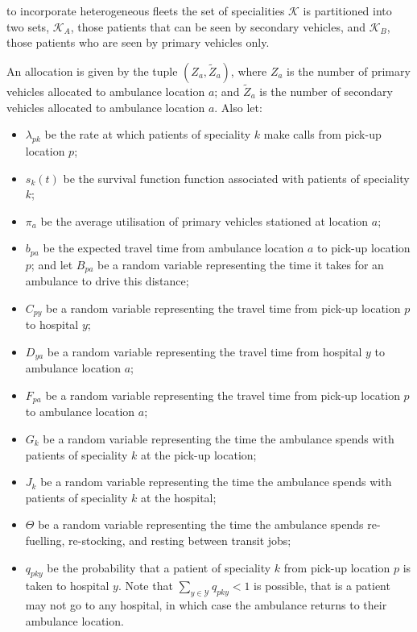 \documentclass[numbers,webpdf,imaman]{ima-authoring-template}%
\begin{document}
\noindent
to incorporate heterogeneous fleets the set of specialities $\mathcal{K}$ is
partitioned into two sets, $\mathcal{K}_A$, those patients that can be seen by
secondary vehicles, and $\mathcal{K}_B$, those patients who are seen by
primary vehicles only.

An allocation is given by the tuple $\left(Z_a, \tilde{Z}_a\right)$, where $Z_a$
is the number of primary vehicles allocated to ambulance location $a$; and
$\tilde{Z}_a$ is the number of secondary vehicles allocated to ambulance
location $a$. Also let:

\begin{itemize}
  \item $\lambda_{pk}$ be the rate at which patients of speciality $k$ make
        calls from pick-up location $p$;
  \item $s_k(t)$ be the survival function function associated with patients of
        speciality $k$;
  \item $\pi_a$ be the average utilisation of primary vehicles stationed at
        location $a$;
  \item $b_{pa}$ be the expected travel time from ambulance location $a$ to
        pick-up location $p$; and let $B_{pa}$ be a random variable representing
        the time it takes for an ambulance to drive this distance;
  \item $C_{py}$ be a random variable representing the travel time from pick-up
        location $p$ to hospital $y$;
  \item $D_{ya}$ be a random variable representing the travel time from hospital
        $y$ to ambulance location $a$;
  \item $F_{pa}$ be a random variable representing the travel time from pick-up
        location $p$ to ambulance location $a$;
  \item $G_k$ be a random variable representing the time the ambulance spends
        with patients of speciality $k$ at the pick-up location;
  \item $J_k$ be a random variable representing the time the ambulance spends
        with patients of speciality $k$ at the hospital;
  \item $\Theta$ be a random variable representing the time the ambulance spends
        re-fuelling, re-stocking, and resting between transit jobs;
  \item $q_{pky}$ be the probability that a patient of speciality $k$ from
        pick-up location $p$ is taken to hospital $y$.
        Note that $\sum_{y \in \mathcal{Y}} q_{pky} < 1$ is possible, that is a
        patient may not go to any hospital, in which case the ambulance returns
        to their ambulance location.
\end{itemize}
\end{document}
